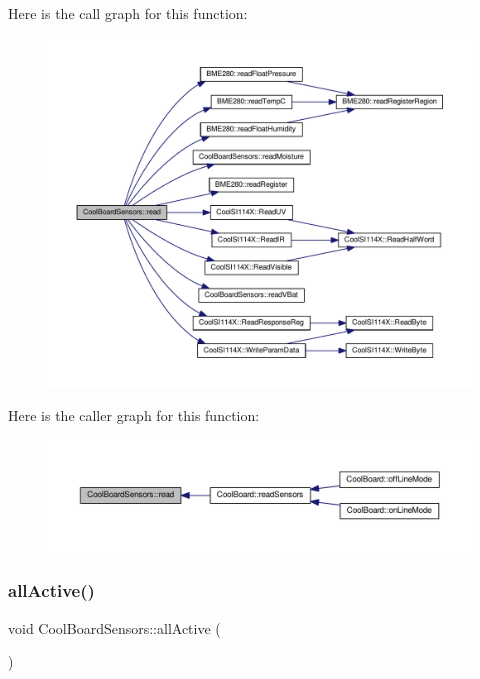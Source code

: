 Here is the call graph for this function\+:
\nopagebreak
\begin{figure}[H]
\begin{center}
\leavevmode
\includegraphics[width=350pt]{de/d46/class_cool_board_sensors_a91badb2539d91fda8679f2a597874c48_cgraph}
\end{center}
\end{figure}
Here is the caller graph for this function\+:
\nopagebreak
\begin{figure}[H]
\begin{center}
\leavevmode
\includegraphics[width=350pt]{de/d46/class_cool_board_sensors_a91badb2539d91fda8679f2a597874c48_icgraph}
\end{center}
\end{figure}
\mbox{\label{class_cool_board_sensors_aa432c5aac88f89c31a10766390f23e0b}} 
\subsubsection{\texorpdfstring{all\+Active()}{allActive()}}
{\footnotesize\ttfamily void Cool\+Board\+Sensors\+::all\+Active (\begin{DoxyParamCaption}{ }\end{DoxyParamCaption})}

